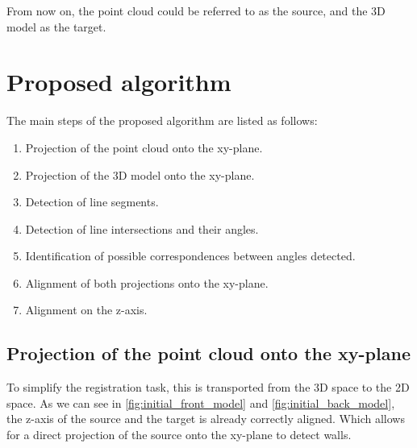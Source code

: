         From now on, the point cloud could be referred to as the source, and the 3D model as the target.
     
    \section{Proposed algorithm}
        The main steps of the proposed algorithm are listed as follows:
        \begin{enumerate}
            \itemsep 0em 
            \item Projection of the point cloud onto the xy-plane.
            \item Projection of the 3D model onto the xy-plane.
            \item Detection of line segments.
            \item Detection of line intersections and their angles.
            \item Identification of possible correspondences between angles detected.
            \item Alignment of both projections onto the xy-plane.
            \item Alignment on the z-axis.
        \end{enumerate}

        \subsection{Projection of the point cloud onto the xy-plane}
        \label{sub:Projection of the point cloud onto the xy-plane}
            To simplify the registration task, this is transported from the 3D space to the 2D space.
            As we can see in \autoref{fig:initial_front_model} and \autoref{fig:initial_back_model}, 
            the z-axis of the source and the target is already correctly aligned.
            Which allows for a direct projection of the source onto the xy-plane to detect walls.

